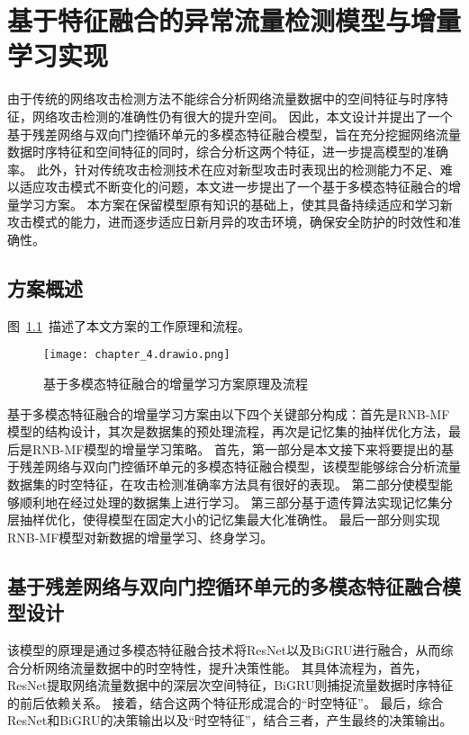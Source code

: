 \chapter{基于特征融合的异常流量检测模型与增量学习实现}
\label{cha:ResNet-BiGRU}

由于传统的网络攻击检测方法不能综合分析网络流量数据中的空间特征与时序特征，网络攻击检测的准确性仍有很大的提升空间。
因此，本文设计并提出了一个基于残差网络与双向门控循环单元的多模态特征融合模型，旨在充分挖掘网络流量数据时序特征和空间特征的同时，综合分析这两个特征，进一步提高模型的准确率。
此外，针对传统攻击检测技术在应对新型攻击时表现出的检测能力不足、难以适应攻击模式不断变化的问题，本文进一步提出了一个基于多模态特征融合的增量学习方案。
本方案在保留模型原有知识的基础上，使其具备持续适应和学习新攻击模式的能力，进而逐步适应日新月异的攻击环境，确保安全防护的时效性和准确性。

\section{方案概述}
图~\ref{fig:attack_detecion_model}~描述了本文方案的工作原理和流程。
\begin{figure}[h]
  \centering
  \texttt{[image: chapter\_4.drawio.png]}
  \caption{基于多模态特征融合的增量学习方案原理及流程}
  \label{fig:attack_detecion_model}
\end{figure}
基于多模态特征融合的增量学习方案由以下四个关键部分构成：首先是RNB-MF模型的结构设计，其次是数据集的预处理流程，再次是记忆集的抽样优化方法，最后是RNB-MF模型的增量学习策略。
首先，第一部分是本文接下来将要提出的基于残差网络与双向门控循环单元的多模态特征融合模型，该模型能够综合分析流量数据集的时空特征，在攻击检测准确率方法具有很好的表现。
第二部分使模型能够顺利地在经过处理的数据集上进行学习。
第三部分基于遗传算法实现记忆集分层抽样优化，使得模型在固定大小的记忆集最大化准确性。
最后一部分则实现RNB-MF模型对新数据的增量学习、终身学习。

\section{基于残差网络与双向门控循环单元的多模态特征融合模型设计}
该模型的原理是通过多模态特征融合技术将ResNet以及BiGRU进行融合，从而综合分析网络流量数据中的时空特性，提升决策性能。
其具体流程为，首先，ResNet提取网络流量数据中的深层次空间特征，BiGRU则捕捉流量数据时序特征的前后依赖关系。
接着，结合这两个特征形成混合的“时空特征”。
最后，综合ResNet和BiGRU的决策输出以及“时空特征”，结合三者，产生最终的决策输出。
